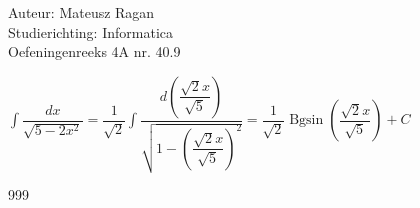 \documentclass[a4paper]{article}
\begin{document}
\noindent \large Auteur: Mateusz Ragan \\
\noindent \large Studierichting: Informatica\\
\noindent \large Oefeningenreeks 4A nr. 40.9\\

\medskip

\normalsize

$ \displaystyle\int \dfrac{dx}{\sqrt{5-2x^2}} = \dfrac{1}{\sqrt{2}} \displaystyle\int \dfrac{d\left(\dfrac{\sqrt{2}x}{\sqrt{5}}\right)}{\sqrt{1-\left(\dfrac{\sqrt{2}x}{\sqrt{5}}\right)^2}} = \dfrac{1}{\sqrt{2}} \operatorname{Bgsin}\left(\dfrac{\sqrt{2}x}{\sqrt{5}}\right) + C$

\begin{thebibliography}{999}
\end{thebibliography}
\end{document}
